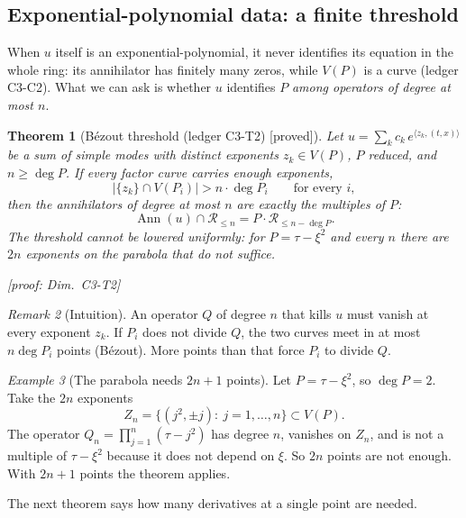 \documentclass[11pt]{article}
\theoremstyle{plain}
\newtheorem{theorem}{Theorem}[section]
\theoremstyle{definition}
\theoremstyle{remark}
\newtheorem{remark}[theorem]{Remark}
\newtheorem{example}[theorem]{Example}
\newcommand{\ring}{\mathcal{R}}            %
\DeclareMathOperator{\Ann}{Ann}             %
\newcommand{\Var}{V}                        %
\newcommand{\badge}[2]{\textcolor{#1}{\textsf{\footnotesize[#2]}}}
\newcommand{\proved}[1][]{\badge{cC}{proved#1}}
\newcommand{\led}[1]{\textcolor{cG}{\textsf{\footnotesize(ledger #1)}}}
\newenvironment{intuition}{\begin{remark}[Intuition]}{\end{remark}}
\newcommand{\dimref}[1]{\textsf{\footnotesize[proof: Dim.~#1]}}
\begin{document}
\subsection{Exponential-polynomial data: a finite threshold}

When $u$ itself is an exponential-polynomial, it never identifies its equation in the whole ring: its annihilator has finitely many zeros, while $\Var(P)$ is a curve \led{C3-C2}. What we can ask is whether $u$ identifies $P$ \emph{among operators of degree at most $n$}.

\begin{theorem}[{B\'ezout threshold \led{C3-T2} \proved}]\label{thm:bezout}
Let $u=\sum_kc_k\,e^{\langle z_k,(t,x)\rangle}$ be a sum of simple modes with distinct exponents $z_k\in\Var(P)$, $P$ reduced, and $n\ge\deg P$. If every factor curve carries enough exponents,
\[
\big|\{z_k\}\cap\Var(P_i)\big|>n\cdot\deg P_i\qquad\text{for every }i,
\]
then the annihilators of degree at most $n$ are exactly the multiples of $P$:
\[
\Ann(u)\cap\ring_{\le n}=P\cdot\ring_{\le n-\deg P}.
\]
The threshold cannot be lowered uniformly: for $P=\tau-\xi^2$ and every $n$ there are $2n$ exponents on the parabola that do not suffice.

\dimref{C3-T2}
\end{theorem}

\begin{intuition}
An operator $Q$ of degree $n$ that kills $u$ must vanish at every exponent $z_k$. If $P_i$ does not divide $Q$, the two curves meet in at most $n\deg P_i$ points (B\'ezout). More points than that force $P_i$ to divide $Q$.
\end{intuition}

\begin{example}[{The parabola needs $2n+1$ points}]
Let $P=\tau-\xi^2$, so $\deg P=2$. Take the $2n$ exponents
\[
Z_n=\{(j^2,\pm j):\ j=1,\dots,n\}\subset\Var(P).
\]
The operator $Q_n=\prod_{j=1}^n(\tau-j^2)$ has degree $n$, vanishes on $Z_n$, and is not a multiple of $\tau-\xi^2$ because it does not depend on $\xi$. So $2n$ points are not enough. With $2n+1$ points the theorem applies.
\end{example}

The next theorem says how many derivatives at a single point are needed.
\end{document}
